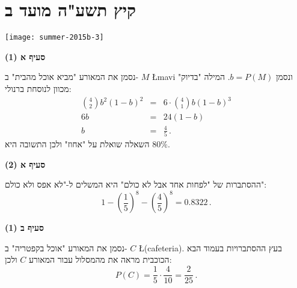 


\section{קיץ תשע"ה מועד ב}

\begin{center}
\texttt{[image: summer-2015b-3]}
\end{center}

\textbf{סעיף א (1)}

נסמן את המאורע "מביא אוכל מהבית" ב-%
$M$ \L{mavi}
ונסמן
$b=P(M)$.
המילה "בדיוק" מכוון לנוסחת ברנולי:
\begin{eqnarray*}
{4 \choose 2} b^2(1-b)^2 &=& 6\cdot {4 \choose 1} b (1-b)^3\\
6b&=&24(1-b)\\
b&=&\frac{4}{5}\,.
\end{eqnarray*}
השאלה שואלת על "אחוז" ולכן התשובה היא
$80\%$.

\textbf{סעיף א (2)}

ההסתברות של "לפחות אחד אבל לא כולם" היא המשלים ל-"לא אפס ולא כולם":
\[
1-\left(\frac{1}{5}\right)^8-\left(\frac{4}{5}\right)^8=0.8322\,.
\]

\textbf{סעיף ב (1)}

נסמן את המאורע "אוכל בקפטריה" ב-%
$C$ \L{(cafeteria)}.
בעץ ההסתברויות בעמוד הבא הכוכבית מראה את מהמסלול עבור המאורע 
$C$
ולכן:
\[
P(C)=\frac{1}{5}\cdot \frac{4}{10} = \frac{2}{25}\,.
\]

